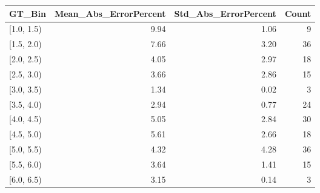 \begin{tabular}{lrrr}
\toprule
GT_Bin & Mean_Abs_ErrorPercent & Std_Abs_ErrorPercent & Count \\
\midrule
[1.0, 1.5) & 9.94 & 1.06 & 9 \\
[1.5, 2.0) & 7.66 & 3.20 & 36 \\
[2.0, 2.5) & 4.05 & 2.97 & 18 \\
[2.5, 3.0) & 3.66 & 2.86 & 15 \\
[3.0, 3.5) & 1.34 & 0.02 & 3 \\
[3.5, 4.0) & 2.94 & 0.77 & 24 \\
[4.0, 4.5) & 5.05 & 2.84 & 30 \\
[4.5, 5.0) & 5.61 & 2.66 & 18 \\
[5.0, 5.5) & 4.32 & 4.28 & 36 \\
[5.5, 6.0) & 3.64 & 1.41 & 15 \\
[6.0, 6.5) & 3.15 & 0.14 & 3 \\
\bottomrule
\end{tabular}
